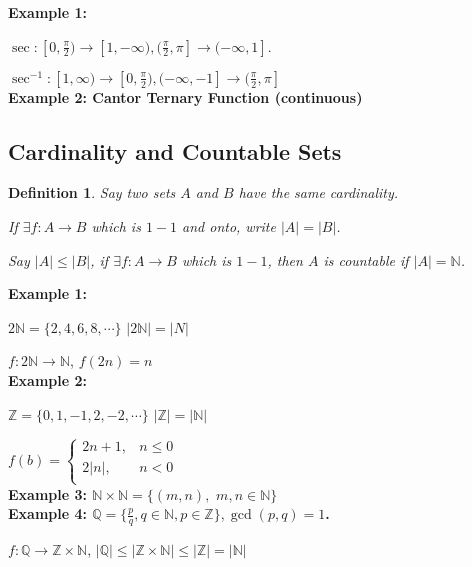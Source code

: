 \documentclass[12pt]{article}
\newcommand{\abs}[1]{\left| #1 \right|}
\theoremstyle{plain}
\newtheorem{definition}{Definition}[subsection]
\begin{document}
    {\color{Brown} 
    \textbf{Example 1: }
    
    $\sec : [0, \frac{\pi}2) \to [1, -\infty),
    (\frac{\pi}2, \pi] \to (-\infty, 1]$.
     
    $\sec^{-1} : [1, \infty) \to [0, \frac{\pi}2), 
    (-\infty, -1] \to (\frac{\pi}2, \pi]$\\


    \textbf{Example 2: Cantor Ternary Function (continuous)}}


    \newpage
    \subsection{Cardinality and Countable Sets}
    \begin{definition}
        Say two sets $A$ and $B$ have the same cardinality.

        If $\exists f: A \to B$ which is $1-1$ and onto, 
        write $\abs{A} = \abs{B}$.

        Say $\abs{A}\leq \abs{B}$, if $\exists f: A \to B$ which is $1-1$,
        then $A$ is countable if $\abs{A} = \mathbb{\mathbb{N}}$.\\
    \end{definition}

    {\color{Brown}
    \textbf{Example 1: }

    $2\mathbb{N} = \{2, 4, 6, 8, \cdots\}$    
    $\abs{2\mathbb{N}}=\abs{N}$
     
    $f:2\mathbb{N} \to \mathbb{N}$, $f(2n)=n$\\

    \textbf{Example 2:}

    $\mathbb{Z} = \{0 ,1, -1, 2, -2, \cdots\}$ \qquad 
    $\abs{\mathbb{Z}}=\abs{\mathbb{N}}$ 

    $f(b) = 
        \begin{cases}
            2n+1,    & n\leq 0\\
            2\abs{n}, & n<0\\
        \end{cases}$\\

        \textbf{Example 3: $\mathbb{N} \times \mathbb{N} = 
    \{(m,n), \,\,m,n\in\mathbb{N}\}$ }\\

    \textbf{Example 4: $\mathbb{Q} = \{\frac pq,
    q\in\mathbb{N}, p \in \mathbb{Z}\}, \gcd(p,q)=1$.}

    $f: \mathbb{Q} \to \mathbb{Z} \times\mathbb{N}$,
    \qquad $\abs{\mathbb{Q}}\leq \abs{\mathbb{Z}\times\mathbb{N}}
    \leq\abs{\mathbb{Z}}=\abs{\mathbb{N}}$}\\
    
\end{document}
